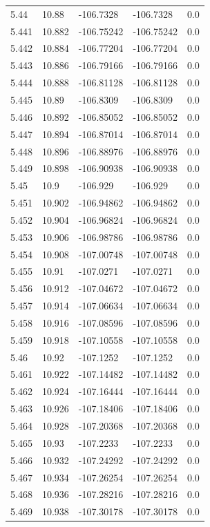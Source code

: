 \begin{tabular}{lllll}
5.44 & 10.88 & -106.7328 & -106.7328 & 0.0 \\
5.441 & 10.882 & -106.75242 & -106.75242 & 0.0 \\
5.442 & 10.884 & -106.77204 & -106.77204 & 0.0 \\
5.443 & 10.886 & -106.79166 & -106.79166 & 0.0 \\
5.444 & 10.888 & -106.81128 & -106.81128 & 0.0 \\
5.445 & 10.89 & -106.8309 & -106.8309 & 0.0 \\
5.446 & 10.892 & -106.85052 & -106.85052 & 0.0 \\
5.447 & 10.894 & -106.87014 & -106.87014 & 0.0 \\
5.448 & 10.896 & -106.88976 & -106.88976 & 0.0 \\
5.449 & 10.898 & -106.90938 & -106.90938 & 0.0 \\
5.45 & 10.9 & -106.929 & -106.929 & 0.0 \\
5.451 & 10.902 & -106.94862 & -106.94862 & 0.0 \\
5.452 & 10.904 & -106.96824 & -106.96824 & 0.0 \\
5.453 & 10.906 & -106.98786 & -106.98786 & 0.0 \\
5.454 & 10.908 & -107.00748 & -107.00748 & 0.0 \\
5.455 & 10.91 & -107.0271 & -107.0271 & 0.0 \\
5.456 & 10.912 & -107.04672 & -107.04672 & 0.0 \\
5.457 & 10.914 & -107.06634 & -107.06634 & 0.0 \\
5.458 & 10.916 & -107.08596 & -107.08596 & 0.0 \\
5.459 & 10.918 & -107.10558 & -107.10558 & 0.0 \\
5.46 & 10.92 & -107.1252 & -107.1252 & 0.0 \\
5.461 & 10.922 & -107.14482 & -107.14482 & 0.0 \\
5.462 & 10.924 & -107.16444 & -107.16444 & 0.0 \\
5.463 & 10.926 & -107.18406 & -107.18406 & 0.0 \\
5.464 & 10.928 & -107.20368 & -107.20368 & 0.0 \\
5.465 & 10.93 & -107.2233 & -107.2233 & 0.0 \\
5.466 & 10.932 & -107.24292 & -107.24292 & 0.0 \\
5.467 & 10.934 & -107.26254 & -107.26254 & 0.0 \\
5.468 & 10.936 & -107.28216 & -107.28216 & 0.0 \\
5.469 & 10.938 & -107.30178 & -107.30178 & 0.0 \\

\end{tabular}
